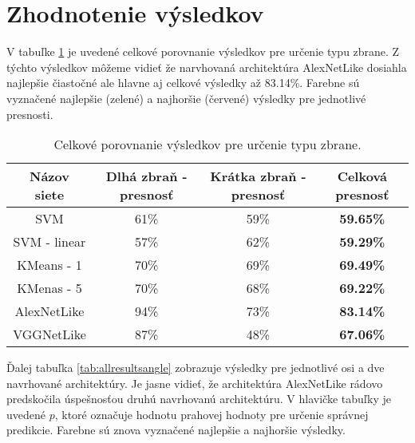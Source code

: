 
\section{Zhodnotenie výsledkov}
V tabuľke \ref{tab:allresultsclass} je uvedené celkové porovnanie výsledkov pre určenie typu zbrane.
Z týchto výsledkov môžeme vidieť že narvhovaná architektúra AlexNetLike dosiahla najlepšie čiastočné ale hlavne aj celkové výsledky až 83.14\%.
Farebne sú vyznačené najlepšie (zelené) a najhoršie (červené) výsledky pre jednotlivé presnosti.

\begin{table}[H]
    \centering
    \begin{tabular}{|c|c|c|c|}
        \hline
        Názov siete  & Dlhá zbraň - presnosť       & Krátka zbraň - presnosť     & Celková presnosť                        \\ \hline
        SVM          & 61\%                        & {\color[HTML]{9A0000} 59\%} & \textbf{59.65\%}                        \\ %
        SVM - linear & {\color[HTML]{9A0000} 57\%} & 62\%                        & {\color[HTML]{9A0000} \textbf{59.29\%}} \\ \hline
        KMeans - 1   & 70\%                        & 69\%                        & \textbf{69.49\%}                        \\ %
        KMenas - 5   & 70\%                        & 68\%                        & \textbf{69.22\%}                        \\ \hline
        AlexNetLike  & {\color[HTML]{009901} 94\%} & {\color[HTML]{009901} 73\%} & {\color[HTML]{009901} \textbf{83.14\%}} \\ %
        VGGNetLike   & 87\%                        & 48\%                        & \textbf{67.06\%}                        \\ \hline
    \end{tabular}
    \caption{Celkové porovnanie výsledkov pre určenie typu zbrane.}
    \label{tab:allresultsclass}
\end{table}

Ďalej tabuľka \ref{tab:allresultsangle} zobrazuje výsledky pre jednotlivé osi a dve navrhované architektúry.
Je jasne vidieť, že architektúra AlexNetLike rádovo predskočila úspešnosťou druhú navrhovanú architektúru.
V hlavičke tabuľky je uvedené $p$, ktoré označuje hodnotu prahovej hodnoty pre určenie správnej predikcie.
Farebne sú znova vyznačené najlepšie a najhoršie výsledky.

